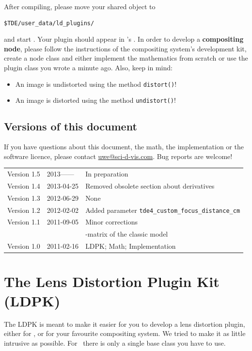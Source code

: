 \documentclass[10pt,a4paper]{article}
\begin{document}
After compiling, please move your shared object to
\begin{verbatim}
$TDE/user_data/ld_plugins/
\end{verbatim}
and start \tde. Your plugin should appear in \tde's .
In order to develop a {\bf compositing node}, please follow the instructions of the compositing system's
development kit, create a node class and either implement the mathematics from scratch
or use the plugin class you wrote a minute ago. Also, keep in mind:
\begin{itemize}
\item An image is undistorted using the method {\tt distort()}!
\item An image is distorted using the method {\tt undistort()}!
\end{itemize}
%
\subsection{Versions of this document}
If you have questions about this document, the math, the implementation or the software licence,
please contact \href{mailto:uwe@sci-d-vis.com}{uwe@sci-d-vis.com}.
Bug reports are welcome!\newline
\newline
\begin{tabular}{lll}
Version 1.5	& 2013------	& In preparation\\
Version 1.4	& 2013-04-25	& Removed obsolete section about derivatives\\
Version 1.3	& 2012-06-29	& None\\
Version 1.2	& 2012-02-02	& Added parameter {\tt tde4\_custom\_focus\_distance\_cm}\\
Version 1.1	& 2011-09-05	& Minor corrections\\
		&		& \Jacobi-matrix of the classic model\\
Version 1.0	& 2011-02-16	& LDPK; Math; Implementation \\
\end{tabular}
%


\section{The Lens Distortion Plugin Kit (LDPK)}
The LDPK is meant to make it easier for you to develop a lens distortion plugin,
either for \tde, or for your favourite compositing system.
We tried to make it as little intrusive as possible. For \tde\ there is
only a single base class you have to use.
%
\setcounter{subsection}{-1}
\end{document}
